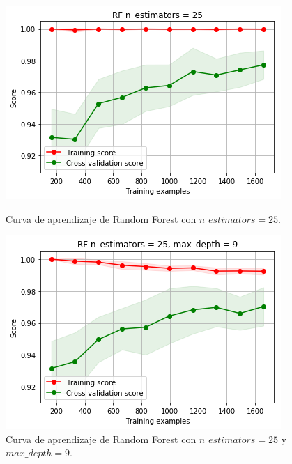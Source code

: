 \documentclass[11pt,a4paper]{article}
\begin{document}
\begin{figure}[H]
\centering
\begin{minipage}{.5\textwidth}
    \centering
    \includegraphics[scale=0.4]{img/lc-rf-n-25.png}
    \caption{Curva de aprendizaje de Random Forest con $n\_estimators=25$.}
    \label{fig:lc-rf-n-25}
\end{minipage}%
\begin{minipage}{.5\textwidth}
    \centering
    \includegraphics[scale=0.4]{img/lc-rf-n-25-d-9.png}
    \caption{Curva de aprendizaje de Random Forest con $n\_estimators=25$ y $max\_depth=9$.}
    \label{fig:lc-rf-n-25-d-9}
\end{minipage}
\end{figure}
\end{document}
